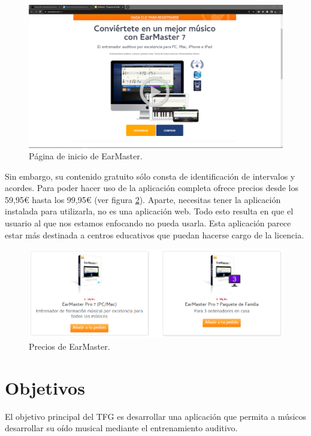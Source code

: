\documentclass[12pt,twoside,titlepage]{report}
\begin{document}
\begin{figure}[H] 
    \includegraphics[scale=0.25]{Estado del Arte/earmaster}
    \centering
    \caption{Página de inicio de EarMaster.}
    \label{fig:earmaster}
\end{figure}

Sin embargo, su contenido gratuito sólo consta de identificación de intervalos y acordes. Para poder hacer uso de la aplicación completa ofrece precios desde los 59,95€ hasta los 99,95€ (ver figura \ref{fig:earmasterprices}). Aparte, necesitas tener la aplicación instalada para utilizarla, no es una aplicación web. Todo esto resulta en que el usuario al que nos estamos enfocando no pueda usarla. Esta aplicación parece estar más destinada a centros educativos que puedan hacerse cargo de la licencia.

\begin{figure}[H] 
    \includegraphics[scale=0.5]{Estado del Arte/earmasterprices}
    \centering
    \caption{Precios de EarMaster.}
    \label{fig:earmasterprices}
\end{figure}

\section{Objetivos}

El objetivo principal del TFG es desarrollar una aplicación que permita a músicos desarrollar su oído musical mediante el entrenamiento auditivo.
\end{document}
